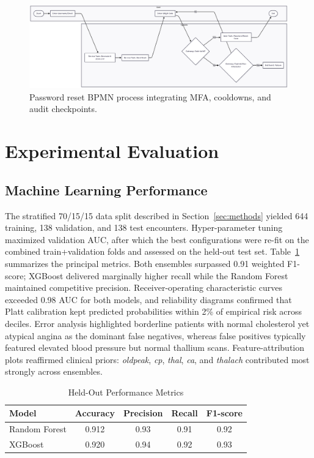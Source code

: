 \documentclass[conference]{IEEEtran}
\begin{document}
\begin{figure}[t]
  \centering
  \includegraphics[width=0.85\linewidth]{password_reset_bpmn_process.png}
  \caption{Password reset BPMN process integrating MFA, cooldowns, and audit checkpoints.}
  \label{fig:pwd_reset_bpmn}
\end{figure}

\section{Experimental Evaluation}
\subsection{Machine Learning Performance}
The stratified 70/15/15 data split described in Section~\ref{sec:methods} yielded 644 training, 138 validation, and 138 test encounters. Hyper-parameter tuning maximized validation AUC, after which the best configurations were re-fit on the combined train+validation folds and assessed on the held-out test set. Table~\ref{tab:metrics} summarizes the principal metrics. Both ensembles surpassed 0.91 weighted F1-score; XGBoost delivered marginally higher recall while the Random Forest maintained competitive precision. Receiver-operating characteristic curves exceeded 0.98 AUC for both models, and reliability diagrams confirmed that Platt calibration kept predicted probabilities within 2\% of empirical risk across deciles. Error analysis highlighted borderline patients with normal cholesterol yet atypical angina as the dominant false negatives, whereas false positives typically featured elevated blood pressure but normal thallium scans. Feature-attribution plots reaffirmed clinical priors: \textit{oldpeak}, \textit{cp}, \textit{thal}, \textit{ca}, and \textit{thalach} contributed most strongly across ensembles.

\begin{table}[t]
  \caption{Held-Out Performance Metrics}
  \label{tab:metrics}
  \centering
  \begin{tabular}{lcccc}
    \toprule
    Model & Accuracy & Precision & Recall & F1-score \\
    \midrule
    Random Forest & 0.912 & 0.93 & 0.91 & 0.92 \\
    XGBoost & 0.920 & 0.94 & 0.92 & 0.93 \\
    \bottomrule
  \end{tabular}
\end{table}
\end{document}
